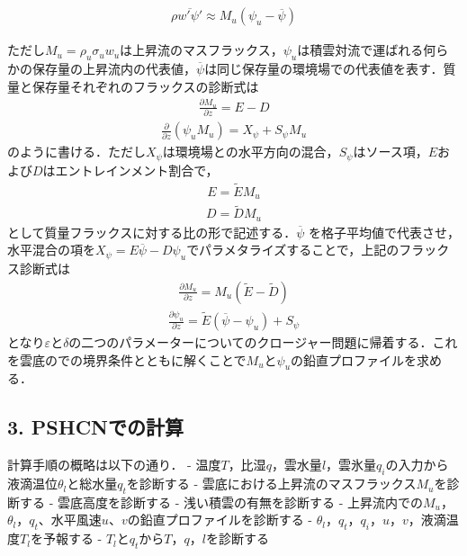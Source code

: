 \begin{eqnarray}\rho \overline {w' \psi '}\approx M_u (\psi_u-\overline{\psi})  \end{eqnarray}

ただし\(M_u=\rho_u\sigma_u w_u\)は上昇流のマスフラックス，\(\psi_u\)は積雲対流で運ばれる何らかの保存量の上昇流内の代表値，\(\overline{\psi}\)は同じ保存量の環境場での代表値を表す．質量と保存量それぞれのフラックスの診断式は
\begin{eqnarray}\frac{\partial M_u}{\partial z} = E - D\end{eqnarray}
\begin{eqnarray}\frac{\partial}{\partial z} (\psi_u M_u) = X_\psi + S_\psi M_u\end{eqnarray}
のように書ける．ただし\(X_\psi\)は環境場との水平方向の混合，\(S_\psi\)はソース項，\(E\)および\(D\)はエントレインメント割合で，
\begin{eqnarray}E=\tilde{E}M_u\end{eqnarray} \begin{eqnarray}D=\tilde{D} M_u\end{eqnarray}
として質量フラックスに対する比の形で記述する．\(\overline{\psi}\)
を格子平均値で代表させ，水平混合の項を\(X_{\psi}=E \overline{\psi} - D\psi_u\)でパラメタライズすることで，上記のフラックス診断式は
\begin{eqnarray}\frac{\partial M_u}{\partial z} = M_u (\tilde{E} - \tilde{D})\end{eqnarray}
\begin{eqnarray}\frac{\partial \psi_u}{\partial z} = \tilde{E}(\overline{\psi} - \psi_u) + S_{\psi}\end{eqnarray}
となり\(\varepsilon\)と\(\delta\)の二つのパラメーターについてのクロージャー問題に帰着する．これを雲底のでの境界条件とともに解くことで\(M_u\)と\(\psi_u\)の鉛直プロファイルを求める．

\hypertarget{pshcnux3067ux306eux8a08ux7b97}{%
\subsection{3. PSHCNでの計算}\label{pshcnux3067ux306eux8a08ux7b97}}

計算手順の概略は以下の通り． -
温度\(T\)，比湿\(q\)，雲水量\(l\)，雲氷量\(q_i\)の入力から液滴温位\(\theta_l\)と総水量\(q_t\)を診断する
- 雲底における上昇流のマスフラックス\(M_u\)を診断する -
雲底高度を診断する - 浅い積雲の有無を診断する -
上昇流内での\(M_u\)，\(\theta_l\)，\(q_t\)、水平風速\(u\)、\(v\)の鉛直プロファイルを診断する
-
\(\theta_l\)，\(q_t\)，\(q_i\)，\(u\)，\(v\)，液滴温度\(T_l\)を予報する
- \(T_l\)と\(q_t\)から\(T\)，\(q\)，\(l\)を診断する


